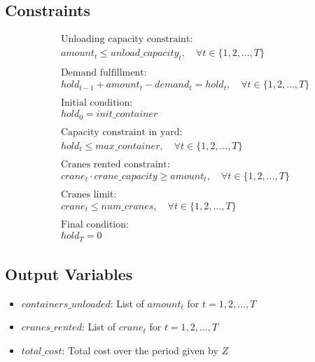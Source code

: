 \documentclass{article}
\begin{document}
\subsection*{Constraints}
\begin{align}
    & \text{Unloading capacity constraint:} \\
    & amount_{t} \leq unload\_capacity_{t}, \quad \forall t \in \{1, 2, \ldots, T\} \\
    & \\
    & \text{Demand fulfillment:} \\
    & hold_{t-1} + amount_{t} - demand_{t} = hold_{t}, \quad \forall t \in \{1, 2, \ldots, T\} \\
    & \\
    & \text{Initial condition:} \\
    & hold_{0} = init\_container \\
    & \\
    & \text{Capacity constraint in yard:} \\
    & hold_{t} \leq max\_container, \quad \forall t \in \{1, 2, \ldots, T\} \\
    & \\
    & \text{Cranes rented constraint:} \\
    & crane_{t} \cdot crane\_capacity \geq amount_{t}, \quad \forall t \in \{1, 2, \ldots, T\} \\
    & \\
    & \text{Cranes limit:} \\
    & crane_{t} \leq num\_cranes, \quad \forall t \in \{1, 2, \ldots, T\} \\
    & \\
    & \text{Final condition:} \\
    & hold_{T} = 0
\end{align}

\subsection*{Output Variables}
\begin{itemize}
    \item $containers\_unloaded$: List of $amount_{t}$ for $t = 1, 2, \ldots, T$
    \item $cranes\_rented$: List of $crane_{t}$ for $t = 1, 2, \ldots, T$
    \item $total\_cost$: Total cost over the period given by $Z$
\end{itemize}
\end{document}
